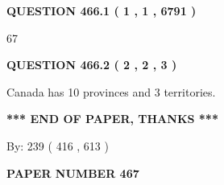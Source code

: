 \documentclass[12pt]{article}
\begin{document}
   
   
   
 \vspace{0.2in}
 
 
 
 
   
   
  
\vspace{0.2in}
  
{\textbf{\Large{QUESTION
466.1 
 ( 1 , 1 , 6791 )
}}}
  
  
 
 
\noindent{}

67
 
 
  
\vspace{0.2in}
  
{\textbf{\Large{QUESTION
466.2 
 ( 2 , 2 , 3 )
}}}
  
  
 
 
\noindent{}
 
 
Canada has 10  provinces and 3 territories.
 
 
 
 
   
   
 \vspace{0.2in}
 
   
   
   
   
\vspace{1.0in} 
{\textbf{\large{ *** END OF PAPER, THANKS *** }}} 
   
   
\hspace{1.0in} By: 
 239 ( 416 ,  613 )
   
   
   
   
\newpage 
\setcounter{page}{ 
   467001 } 
   
   
   
   
 {\textbf{ \Large{ PAPER NUMBER  467  }}}
   
   
\vspace{0.2in}
   
   
   
   
   
   
 \vspace{0.2in}
 
 
 
 
   
\end{document}
